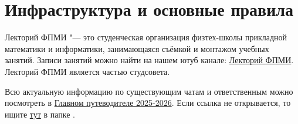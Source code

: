 \section{Инфраструктура и основные правила}\label{sec:infrastructure}

Лекторий ФПМИ "--- это студенческая организация физтех-школы прикладной математики и информатики, занимающаяся съёмкой и монтажом учебных занятий. Записи занятий можно найти на нашем ютуб канале: \href{https://www.youtube.com/channel/UCdxesVp6Fs7wLpnp1XKkvZg}{Лекторий ФПМИ}. Лекторий ФПМИ является частью студсовета.

Всю актуальную информацию по существующим чатам и ответственным можно посмотреть в \href{https://docs.google.com/document/d/1C0CD0fsVVS9BenCpTreZ5FcqkIHK0CbTvGP9FLZNw_U}{Главном путеводителе 2025-2026}. Если ссылка не открывается, то ищите \href{https://vk.com/away.php?utf=1&to=https%3A%2F%2Fdrive.stfpmi.ru%2Fapps%2Ffiles%2F}{тут} в папке \mitem{Лекторий ФПМИ}.







